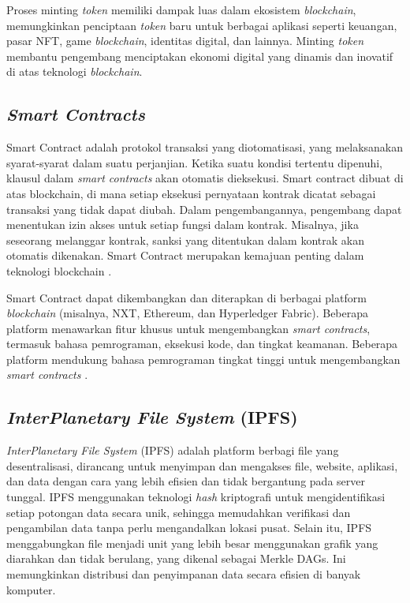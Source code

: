 Proses minting \emph{token} memiliki dampak luas dalam ekosistem \emph{blockchain}, memungkinkan penciptaan \emph{token} baru untuk berbagai aplikasi seperti keuangan, pasar NFT, game \emph{blockchain}, identitas digital, dan lainnya. Minting \emph{token} membantu pengembang menciptakan ekonomi digital yang dinamis dan inovatif di atas teknologi \emph{blockchain}. 

\subsection{\emph{Smart Contracts}}
Smart Contract adalah protokol transaksi yang diotomatisasi, yang melaksanakan syarat-syarat dalam suatu perjanjian. Ketika suatu kondisi tertentu dipenuhi, klausul dalam \emph{smart contracts} akan otomatis dieksekusi. Smart contract dibuat di atas blockchain, di mana setiap eksekusi pernyataan kontrak dicatat sebagai transaksi yang tidak dapat diubah. Dalam pengembangannya, pengembang dapat menentukan izin akses untuk setiap fungsi dalam kontrak. Misalnya, jika seseorang melanggar kontrak, sanksi yang ditentukan dalam kontrak akan otomatis dikenakan. Smart Contract merupakan kemajuan penting dalam teknologi blockchain \cite{Zheng2020}.

Smart Contract dapat dikembangkan dan diterapkan di berbagai platform \emph{blockchain} (misalnya, NXT, Ethereum, dan Hyperledger Fabric). Beberapa platform menawarkan fitur khusus untuk mengembangkan \emph{smart contracts}, termasuk bahasa pemrograman, eksekusi kode, dan tingkat keamanan. Beberapa platform mendukung bahasa pemrograman tingkat tinggi untuk mengembangkan \emph{smart contracts} \cite{Khan2021}.

\subsection{\emph{InterPlanetary File System} (IPFS)}
\emph{InterPlanetary File System } (IPFS) adalah platform berbagi file yang desentralisasi, dirancang untuk menyimpan dan mengakses file, website, aplikasi, dan data dengan cara yang lebih efisien dan tidak bergantung pada server tunggal. IPFS menggunakan teknologi \emph{hash} kriptografi untuk mengidentifikasi setiap potongan data secara unik, sehingga memudahkan verifikasi dan pengambilan data tanpa perlu mengandalkan lokasi pusat. Selain itu, IPFS menggabungkan file menjadi unit yang lebih besar menggunakan grafik yang diarahkan dan tidak berulang, yang dikenal sebagai Merkle DAGs. Ini memungkinkan distribusi dan penyimpanan data secara efisien di banyak komputer.

